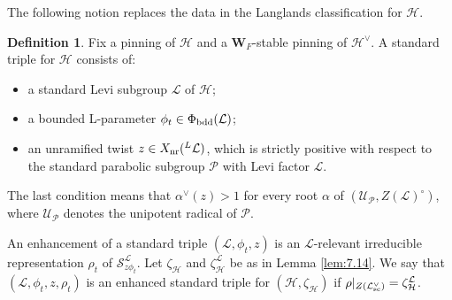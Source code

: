\documentclass[11pt]{amsart}
\theoremstyle{definition}
\newtheorem{defn}[thm]{Definition}
\newcommand{\mb}{\mathbf}
\newcommand{\mc}{\mathcal}
\def\cS{{\mathcal S}}
\def\cL{{\mathcal L}}
\def\cH{{\mathcal H}}
\def\nr{{\rm nr}}
\def\bdd{{\rm bdd}}
\def\sc{{\rm sc}}
\def\bdd{{\rm bdd}}
\begin{document}
The following notion replaces the data in the Langlands classification for $\cH$.

\begin{defn}\label{def:8.1}
Fix a pinning of $\cH$ and a $\mb W_F$-stable pinning of $\cH^\vee$. 
A standard triple for $\cH$ consists of:
\begin{itemize}
\item a standard Levi subgroup $\cL$ of $\cH$;
\item a bounded L-parameter $\phi_t \in \Phi_{\bdd}(\cL)$;
\item an unramified twist $z \in X_\nr ({}^L \cL)$, which is strictly positive
with respect to the standard parabolic subgroup $\mc P$ with Levi factor $\cL$.
\end{itemize}
The last condition means that $\alpha^\vee (z) > 1$ for every root $\alpha$
of $(\mc U_{\mc P}, Z(\cL)^\circ)$, where $\mc U_{\mc P}$ denotes the unipotent 
radical of $\mc P$. 

An enhancement of a standard triple $(\cL,\phi_t,z)$ is an $\cL$-relevant
irreducible representation $\rho_t$ of $\cS^\cL_{z \phi_t}$. Let $\zeta_\cH$ and 
$\zeta_\cH^\cL$ be as in Lemma \ref{lem:7.14}. We say that $(\cL,\phi_t,z,\rho_t)$
is an enhanced standard triple for $(\cH,\zeta_\cH)$ if $\rho |_{Z(\cL^\vee_\sc)}
= \zeta_\cH^\cL$.
\end{defn}
\end{document}
